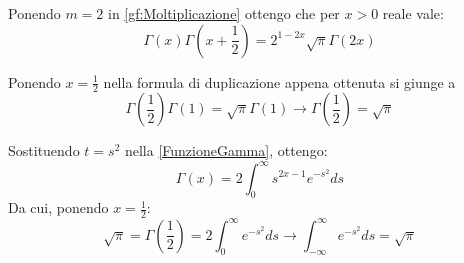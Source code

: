\begin{corollary} \label{Duplicazione}
	Ponendo $m=2$ in \cref{gf:Moltiplicazione} ottengo che per $x>0$ reale vale:
	\begin{equation*}
		\Gamma(x)\Gamma\left(x+\frac12\right)=2^{1-2x}\sqrt{\pi}\Gamma(2x)
	\end{equation*}
\end{corollary}

\begin{remark}
	Ponendo $x=\frac12$ nella formula di duplicazione appena ottenuta si giunge a 
	\begin{equation*}
		\Gamma\left(\frac12\right)\Gamma(1)=\sqrt{\pi}\Gamma(1) \to \Gamma\left(\frac12\right)=\sqrt{\pi}
	\end{equation*}
\end{remark}

\begin{remark} \label{GaussIntegral}
	Sostituendo $t=s^2$ nella \cref{FunzioneGamma}, ottengo:
	\begin{equation}
		\Gamma(x)=2\int_0^{\infty}{s^{2x-1}e^{-s^2}ds}
	\end{equation}
	Da cui, ponendo $x=\frac{1}{2}$:
	\begin{equation*}
		\sqrt{\pi}=\Gamma\left(\frac{1}{2}\right)=2\int_0^{\infty}{e^{-s^2}ds}\to \int_{-\infty}^{\infty}{e^{-s^2}ds}=\sqrt{\pi}
	\end{equation*}
\end{remark}



